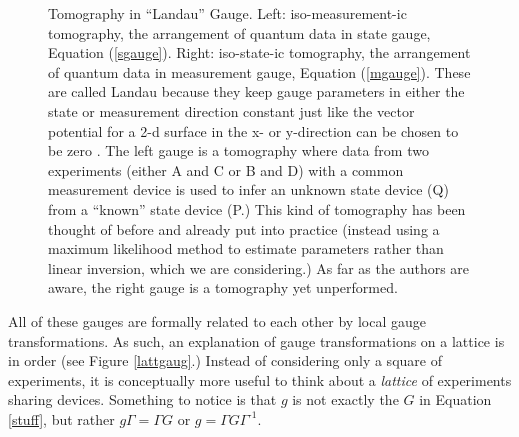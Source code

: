 \documentclass[pra, 10pt, notitlepage, twocolumn]{revtex4-1}
\newcommand{\inv}{\text{-1}}
\newcommand{\pref}[1]{(\ref{#1})}
\begin{document}
\begin{figure}[H]\centering
{}
\caption{Tomography in ``Landau'' Gauge.
Left: iso-measurement-ic tomography, the arrangement of quantum data in state gauge, Equation \pref{sgauge}.
Right: iso-state-ic tomography, the arrangement of quantum data in measurement gauge, Equation \pref{mgauge}.
These are called Landau because they keep gauge parameters in either the state or measurement direction constant
just like the vector potential for a 2-d surface in the x- or y-direction can be chosen to be zero .
The left gauge is a tomography where data from two experiments (either A and C or B and D) with a common measurement device
is used to infer an unknown state device (Q) from a ``known'' state device (P.) 
This kind of tomography has been thought of before and already put into practice \cite{cooper2014local} (instead using a maximum likelihood method to estimate parameters rather than linear inversion, which we are considering.)
As far as the authors are aware, the right gauge is a tomography yet unperformed.
\label{landau}}
\end{figure}


All of these gauges are formally related to each other by local gauge transformations.
As such, an explanation of gauge transformations on a lattice is in order (see Figure \ref{lattgaug}.)
Instead of considering only a square of experiments,
it is conceptually more useful to think about a \emph{lattice} of experiments sharing devices.
Something to notice is that $g$ is not exactly the $G$ in Equation \ref{stuff}, but rather $g\Gamma = \Gamma G$ or $g = \Gamma G \Gamma^\inv$.

 
 
\end{document}
